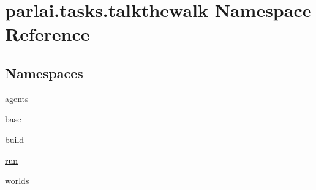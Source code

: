 \hypertarget{namespaceparlai_1_1tasks_1_1talkthewalk}{}\section{parlai.\+tasks.\+talkthewalk Namespace Reference}
\label{namespaceparlai_1_1tasks_1_1talkthewalk}
\subsection*{Namespaces}
\begin{DoxyCompactItemize}
\item 
 \hyperlink{namespaceparlai_1_1tasks_1_1talkthewalk_1_1agents}{agents}
\item 
 \hyperlink{namespaceparlai_1_1tasks_1_1talkthewalk_1_1base}{base}
\item 
 \hyperlink{namespaceparlai_1_1tasks_1_1talkthewalk_1_1build}{build}
\item 
 \hyperlink{namespaceparlai_1_1tasks_1_1talkthewalk_1_1run}{run}
\item 
 \hyperlink{namespaceparlai_1_1tasks_1_1talkthewalk_1_1worlds}{worlds}
\end{DoxyCompactItemize}
